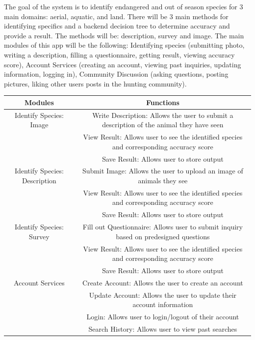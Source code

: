 \documentclass[]{article}
\begin{document}
The goal of the system is to identify endangered and out of season species for 3 main domains: aerial, aquatic, and land. There will be 3 main methods for identifying specifics and a backend decision tree to determine accuracy and provide a result. The methods will be: description, survey and image. The main modules of this app will be the following: Identifying species (submitting photo, writing a description, filling a questionnaire, getting result, viewing accuracy score), Account Services (creating an account, viewing past inquiries, updating information, logging in), Community Discussion (asking questions, posting pictures, liking other users posts in the hunting community). 

\begin{center}
	\begin{tabular}{ |c|c| } 
	\hline
	Modules & Functions \\
	\hline
	Identify Species: Image 
	& Write Description: Allows the user to submit a description of the animal they have seen \\ 
	& View Result: Allows user to see the identified species and corresponding accuracy score \\
	& Save Result: Allows user to store output \\
   \hline
   Identify Species: Description & Submit Image: Allows the user to upload an image of animals they see \\ 
   & View Result: Allows user to see the identified species and corresponding accuracy score \\
   & Save Result: Allows user to store output \\
  \hline	
  \hline
  Identify Species: Survey 
  & Fill out Questionnaire: Allows user to submit inquiry based on predesigned questions \\ 
  & View Result: Allows user to see the identified species and corresponding accuracy score \\
  & Save Result: Allows user to store output \\
 \hline	
  Account Services & Create Account: Allows the user to create an account\\ 
  & Update Account: Allows the user to update their account information \\ 
  & Login: Allows user to login/logout of their account  \\ 
  & Search History: Allows user to view past searches\\
 \hline
   \end{tabular}
\end{center}
\end{document}
